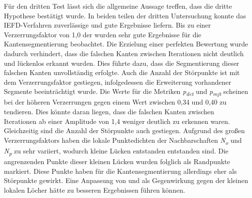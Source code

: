 Für den dritten Test lässt sich die allgemeine Aussage treffen, dass die dritte Hypothese bestätigt wurde. In beiden teilen der dritten Untersuchung konnte das IEFD-Verfahren zuverlässige und gute Ergebnisse liefern. Bis zu einer Verzerrungsfaktor von 1,0 der wurden sehr gute Ergebnisse für die Kantensegmentierung beobachtet. Die Erzielung einer perfekten Bewertung wurde dadurch verhindert, dass die falschen Kanten zwischen Iterationen nicht deutlich und lückenlos erkannt wurden. Dies führte dazu, dass die Segmentierung dieser falschen Kanten unvollständig erfolgte. Auch die Anzahl der Störpunkte ist mit dem Verzerrungsfaktor gestiegen, infolgedessen die Erweiterung vorhandener Segmente beeinträchtigt wurde. Die Werte für die Metriken \textit{p\textsubscript{dct}} und \textit{p\textsubscript{mjt}} scheinen bei der höheren Verzerrungen gegen einem Wert zwischen 0,34 und 0,40 zu tendieren. Dies könnte daran liegen, dass die falschen Kanten zwischen Iterationen ab einer Amplitude von 1,4 weniger deutlich zu erkennen waren. Gleichzeitig sind die Anzahl der Störpunkte auch gestiegen. Aufgrund des großen Verzerrungsfaktors haben die lokale Punktedichten der Nachbarschaften \textit{N\textsubscript{o}} und \textit{N\textsubscript{p}} zu sehr variiert, wodurch kleine Lücken entstanden entstanden sind. Die angrenzenden Punkte dieser kleinen Lücken wurden folglich als Randpunkte markiert. Diese Punkte haben für die Kantensegmentierung allerdings eher als Störpunkte gewirkt. Eine Anpassung von \distthresha und \distthreshb als Gegenwirkung gegen der kleinen lokalen Löcher hätte zu besseren Ergebnissen führen können. 

